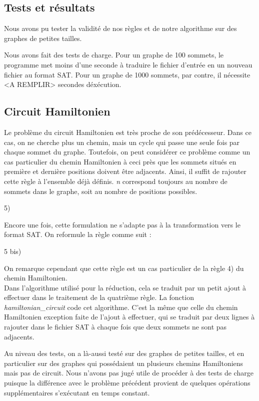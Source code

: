 \documentclass{article}
\begin{document}
\subsection{Tests et r\'esultats}

Nous avons pu tester la validit\'e de nos r\`egles et de notre algorithme sur des graphes de petites tailles.

Nous avons fait des tests de charge. Pour un graphe de 100 sommets, le programme met moins d'une seconde \`a traduire le fichier
d'entr\'ee en un nouveau fichier au format SAT. Pour un graphe de 1000 sommets, par contre, il n\'ecessite <A REMPLIR> secondes
d\'ex\'ecution.

\subsection{Circuit Hamiltonien}

Le probl\`eme du circuit Hamiltonien est tr\`es proche de son pr\'ed\'ecesseur. Dans ce cas, on ne cherche plus un chemin, mais
un cycle qui passe une seule fois par chaque sommet du graphe. Toutefois, on peut consid\'erer ce probl\`eme comme un cas
particulier du chemin Hamiltonien \`a ceci pr\`es que les sommets situ\'es en premi\`ere et derni\`ere positions doivent \^etre
adjacents. Ainsi, il suffit de rajouter cette r\`egle \`a l'ensemble d\'ej\`a d\'efinis. \textit{n} correspond toujours au
nombre de sommets dans le graphe, soit au nombre de positions possibles.

5)%

Encore une fois, cette formulation ne s'adapte pas \`a la transformation vers le format SAT. On reformule la r\`egle comme
suit :

5 bis) %

On remarque cependant que cette r\`egle est un cas particulier de la r\`egle 4) du chemin Hamiltonien.\\

Dans l'algorithme utilis\'e pour la r\'eduction, cela se traduit par un petit ajout \`a effectuer dans le traitement de
la quatri\`eme r\`egle. La fonction \textit{hamiltonian\_circuit} code cet algorithme. C'est la m\^eme que celle
du chemin Hamiltonien exception faite de l'ajout \`a effectuer, qui se traduit par deux lignes \`a rajouter dans le
fichier SAT \`a chaque fois que deux sommets ne sont pas adjacents.

Au niveau des tests,  on a l\`a-aussi test\'e sur des graphes de petites tailles, et en particulier sur des graphes qui
poss\'edaient un plusieurs chemins Hamiltoniens mais pas de circuit.
Nous n'avons pas jug\'e utile de proc\'eder \`a des tests de charge puisque la diff\'erence avec le probl\`eme pr\'ec\'edent
provient de quelques op\'erations suppl\'ementaires s'ex\'ecutant en temps constant.
\end{document}
